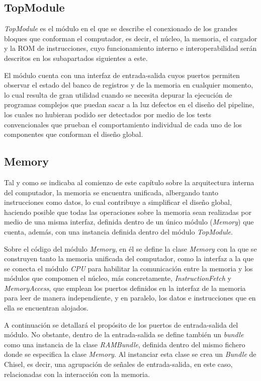 \subsection{TopModule}

\textit{TopModule} es el módulo en el que se describe el conexionado de los grandes bloques que conforman el computador, es decir, el núcleo, la memoria, el cargador y la ROM de instrucciones, cuyo funcionamiento interno e interoperabilidad serán descritos en los subapartados siguientes a este.

El módulo cuenta con una interfaz de entrada-salida cuyos puertos permiten observar el estado del banco de registros y de la memoria en cualquier momento, lo cual resulta de gran utilidad cuando se necesita depurar la ejecución de programas complejos que puedan sacar a la luz defectos en el diseño del pipeline, los cuales no hubieran podido ser detectados por medio de los tests convencionales que prueban el comportamiento individual de cada uno de los componentes que conforman el diseño global.

\subsection{Memory}

Tal y como se indicaba al comienzo de este capítulo sobre la arquitectura interna del computador, la memoria se encuentra unificada, albergando tanto instrucciones como datos, lo cual contribuye a simplificar el diseño global, haciendo posible que todas las operaciones sobre la memoria sean realizadas por medio de una misma interfaz, definida dentro de un único módulo (\textit{Memory}) que cuenta, además, con una instancia definida dentro del módulo \textit{TopModule}.

Sobre el código del módulo \textit{Memory}, en él se define la clase \textit{Memory} con la que se construyen tanto la memoria unificada del computador, como la interfaz a la que se conecta el módulo \textit{CPU} para habilitar la comunicación entre la memoria y los módulos que compomen el núcleo, más concretamente, \textit{InstructionFetch} y \textit{MemoryAccess}, que emplean los puertos definidos en la interfaz de la memoria para leer de manera independiente, y en paralelo, los datos e instrucciones que en ella se encuentran alojados.

A continuación se detallará el propósito de los puertos de entrada-salida del módulo. No obstante, dentro de la entrada-salida se define también un \textit{bundle} como una instancia de la clase \textit{RAMBundle}, definida dentro del mismo fichero donde se especifica la clase \textit{Memory}. Al instanciar esta clase se crea un \textit{Bundle} de Chisel, es decir, una agrupación de señales de entrada-salida, en este caso, relacionadas con la interacción con la memoria.

